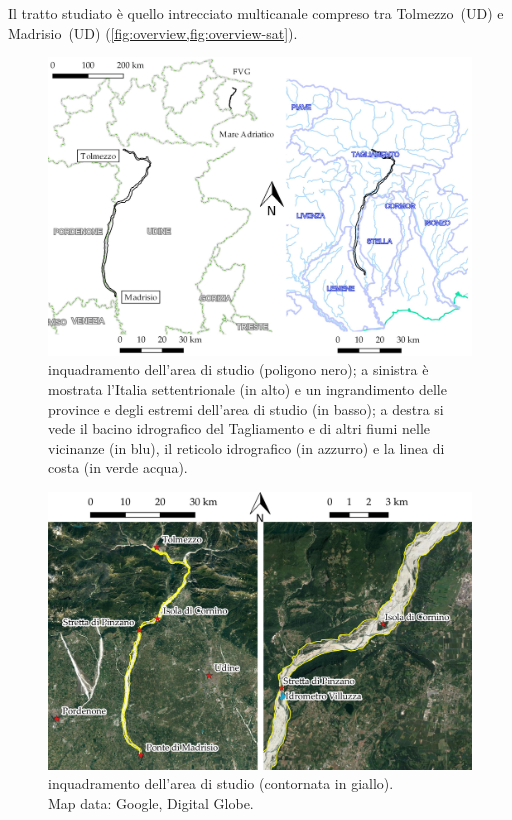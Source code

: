 Il tratto studiato è quello intrecciato multicanale compreso tra Tolmezzo~(UD) e Madrisio~(UD) (\vref{fig:overview,fig:overview-sat}). 
%
\begin{figure}
	\centering
	\includegraphics[width=\textwidth]{files/overview.jpeg}
	\caption[inquadramento dell'area di studio]
		{inquadramento dell'area di studio (poligono nero); a sinistra è mostrata l'Italia settentrionale (in alto) e un ingrandimento delle province e degli estremi dell'area di studio (in basso); a destra si vede il bacino idrografico del Tagliamento e di altri fiumi nelle vicinanze (in blu), il reticolo idrografico (in azzurro) e la linea di costa (in verde acqua).}
	\label{fig:overview}
\end{figure}
%
\begin{figure}
	\centering
	\includegraphics[width=\textwidth]{files/overview_tratto_sat.jpeg}
	\caption[inquadramento dell'area di studio]{inquadramento dell'area di studio (contornata in giallo).
	\\
	Map data: Google, Digital Globe.}
	\label{fig:overview-sat}
\end{figure}
